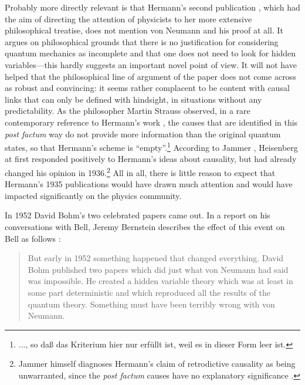 \documentclass[12pt]{article}
\begin{document}
Probably more directly relevant is that Hermann's second publication \cite{hermann2}, which had the aim of directing the attention of physicists to her more extensive philosophical treatise, does not mention von Neumann and his proof at all. It argues on philosophical grounds that there is no justification for considering quantum mechanics as incomplete and that one does not need to look for hidden variables---this hardly suggests an important novel point of view. It will not have helped that the philosophical line of argument of the paper does not come across as robust and convincing: it seems rather complacent to be content with causal links that can only be defined with hindsight, in situations without any predictability. As the philosopher Martin Strauss observed, in a rare contemporary reference to Hermann's work \cite[p.\@ 338]{strauss}, the causes that are identified in this \emph{post factum} way do not provide more information than the original quantum states, so that Hermann's scheme is ``empty''.\footnote{..., so da{\ss} das Kriterium hier nur erf\"{u}llt ist, weil es in dieser Form leer ist.} According to Jammer \cite[pp.\@ 209--210]{jammer}, Heisenberg at first responded positively to Hermann's ideas about causality, but had already changed his opinion in 1936.\footnote{Jammer himself diagnoses Hermann's claim of retrodictive causality as being unwarranted, since the \emph{post factum} causes have no explanatory significance \cite[p.\@ 209]{jammer}.} All in all, there is little reason to expect that Hermann's 1935 publications would have drawn much attention and would have impacted significantly on the physics community.

In 1952 David Bohm's two celebrated papers came out. In a report on his conversations with Bell, Jeremy Bernstein describes the effect of this event on Bell as follows \cite{bernstein}:
\begin{quote}
But early in 1952 something happened that changed everything. David Bohm published two papers which did just what von Neumann
had said was impossible. He created a hidden variable theory which was at least in some part deterministic and which reproduced all the results of the quantum theory. Something must have been terribly wrong with von Neumann.
\end{quote}
\end{document}
